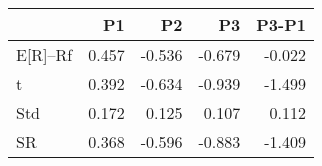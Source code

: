 \begin{tabular}{lrrrr}
\toprule
 & P1 & P2 & P3 & P3-P1 \\
\midrule
E[R]--Rf & 0.457 & -0.536 & -0.679 & -0.022 \\
t & 0.392 & -0.634 & -0.939 & -1.499 \\
Std & 0.172 & 0.125 & 0.107 & 0.112 \\
SR & 0.368 & -0.596 & -0.883 & -1.409 \\
\bottomrule
\end{tabular}
